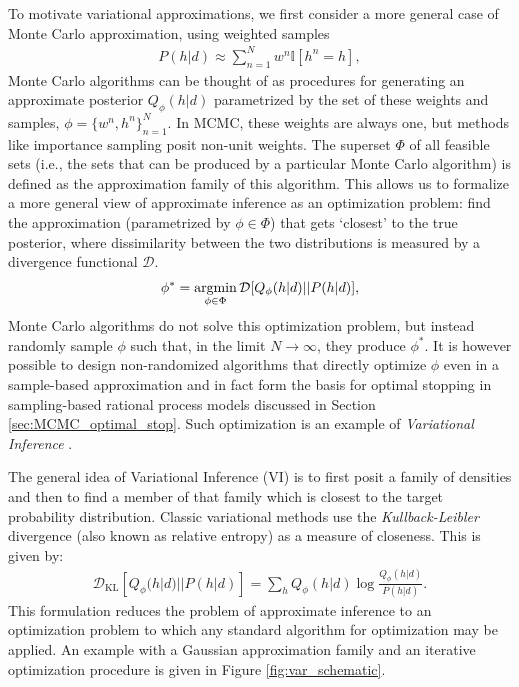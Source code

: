To motivate variational approximations, we first consider a more general case of Monte Carlo approximation, using weighted samples
\begin{align}
    P(h|d) \approx \sum_{n=1}^N w^n \mathbb{I}[h^n = h],
    \label{eq:montecarlo}
\end{align}
Monte Carlo algorithms can be thought of as procedures for generating an approximate posterior $Q_\phi(h|d)$ parametrized by the set of these weights and samples, $\phi = \{ w^n, h^n \}_{n=1}^N$. In MCMC, these weights are always one, but methods like importance sampling posit non-unit weights. The superset $\Phi$ of all feasible sets (i.e., the sets that can be produced by a particular Monte Carlo algorithm) is defined as the approximation family of this algorithm. This allows us to formalize a more general view of approximate inference as an optimization problem: find the approximation (parametrized by $\phi \in \Phi$) that gets `closest' to the true posterior, where dissimilarity between the two distributions is measured by a divergence functional $\mathcal{D}$. 
\begin{align}
\phi^\ast = \operatorname*{argmin}_{\phi \in \Phi} \mathcal{D}[Q_\phi(h|d)||P(h|d)],
\end{align}
Monte Carlo algorithms do not solve this optimization problem, but instead randomly sample $\phi$ such that, in the limit $N \rightarrow \infty$, they produce $\phi^\ast$. It is however possible to design non-randomized algorithms that directly optimize $\phi$ even in a sample-based approximation\citep{saeedi2017variational} and in fact form the basis for optimal stopping in sampling-based rational process models discussed in Section \ref{sec:MCMC_optimal_stop}. Such optimization is an example of \emph{Variational Inference} \citep{jordan1999introduction}.

The general idea of Variational Inference (VI) is to first posit a family of densities and then to find a member of that family which is closest to the target probability distribution. Classic variational methods use the \textit{Kullback-Leibler} divergence (also known as relative entropy) as a measure of closeness. This is given by:
\begin{align}
\mathcal{D}_{\text{KL}}[Q_\phi(h|d)||P(h|d)] = \sum_h Q_\phi(h|d) \log \frac{Q_\phi(h|d)}{P(h|d)}.
\end{align}
This formulation reduces the problem of approximate inference to an optimization problem to which any standard algorithm for optimization may be applied. An example with a Gaussian approximation family and an iterative optimization procedure is given in Figure \ref{fig:var_schematic}.

